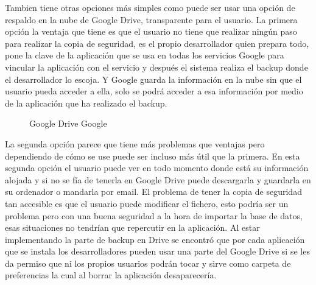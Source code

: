 Tambien tiene otras opciones más simples como puede ser usar una opción de respaldo en la nube de Google Drive\cite{GDrive}, transparente para el usuario.
La primera opción la ventaja que tiene es que el usuario no tiene que realizar ningún paso para realizar la copia de seguridad, es el propio desarrollador quien prepara todo, pone la clave de la aplicación que se usa en todas los servicios Google para vincular la aplicación con el servicio y después el sistema realiza el backup donde el desarrollador lo escoja. Y Google guarda la información en la nube sin que el usuario pueda acceder a ella, solo se podrá acceder a esa información por medio de la aplicación que ha realizado el backup.

\begin{figure}[H] 
  \begin{center} 
    \caption{Google Drive Google} 
    \label{fig:Drive} 
  \end{center} 
\end{figure}

La segunda opción parece que tiene más problemas que ventajas pero dependiendo de cómo se use puede ser incluso más útil que la primera.
En esta segunda opción el usuario puede ver en todo momento donde está su información alojada y si no se fía de tenerla en Google Drive puede descargarla y guardarla en su ordenador o mandarla por email.
El problema de tener la copia de seguridad tan accesible es que el usuario puede modificar el fichero, esto podría ser un problema pero con una buena seguridad a la hora de importar la base de datos, esas situaciones no tendrían que repercutir en la aplicación.
Al estar implementando la parte de backup en Drive se encontró que por cada aplicación que se instala los desarrolladores pueden usar una parte del Google Drive si se les da permiso que ni los propios usuarios podrán tocar y sirve como carpeta de preferencias la cual al borrar la aplicación desaparecería.

